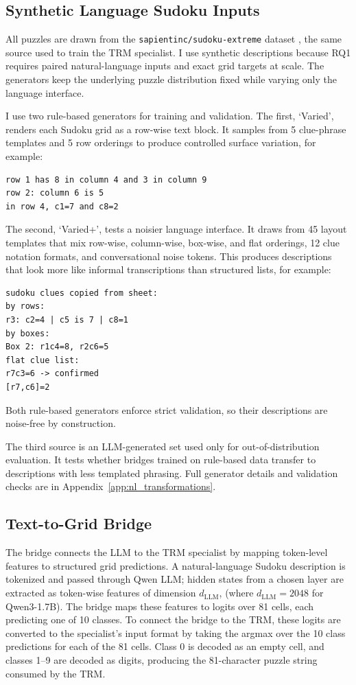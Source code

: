 \documentclass[11pt]{article}
\begin{document}
\subsection{Synthetic Language Sudoku Inputs}
\label{sec:synthetic_language_sudoku_inputs}

All puzzles are drawn from the \texttt{sapientinc/sudoku-extreme} dataset \cite{SapientincSudokuextremeDatasets}, the same source used to train the TRM specialist.
I use synthetic descriptions because RQ1 requires paired natural-language inputs and exact grid targets at scale.
The generators keep the underlying puzzle distribution fixed while varying only the language interface.

I use two rule-based generators for training and validation.
The first, `Varied', renders each Sudoku grid as a row-wise text block.
It samples from 5 clue-phrase templates and 5 row orderings to produce controlled surface variation, for example:
\begin{verbatim}
row 1 has 8 in column 4 and 3 in column 9
row 2: column 6 is 5
in row 4, c1=7 and c8=2
\end{verbatim}
The second, `Varied+', tests a noisier language interface.
It draws from 45 layout templates that mix row-wise, column-wise, box-wise, and flat orderings, 12 clue notation formats, and conversational noise tokens.
This produces descriptions that look more like informal transcriptions than structured lists, for example:
\begin{verbatim}
sudoku clues copied from sheet:
by rows:
r3: c2=4 | c5 is 7 | c8=1
by boxes:
Box 2: r1c4=8, r2c6=5
flat clue list:
r7c3=6 -> confirmed
[r7,c6]=2
\end{verbatim}
Both rule-based generators enforce strict validation, so their descriptions are noise-free by construction.

The third source is an LLM-generated set used only for out-of-distribution evaluation.
It tests whether bridges trained on rule-based data transfer to descriptions with less templated phrasing.
Full generator details and validation checks are in Appendix~\ref{app:nl_transformations}.



\subsection{Text-to-Grid Bridge}
\label{sec:text_to_grid_bridge}

The bridge connects the LLM to the TRM specialist by mapping token-level features to structured grid predictions.
A natural-language Sudoku description is tokenized and passed through Qwen \cite{yangQwen3TechnicalReport2025} LLM; hidden states from a chosen layer are extracted as token-wise features of dimension $d_\text{LLM}$, (where $d_\text{LLM} = 2048$ for Qwen3-1.7B).
The bridge maps these features to logits over 81 cells, each predicting one of 10 classes.
To connect the bridge to the TRM, these logits are converted to the specialist's input format by taking the argmax over the 10 class predictions for each of the 81 cells.
Class 0 is decoded as an empty cell, and classes 1--9 are decoded as digits, producing the 81-character puzzle string consumed by the TRM.
\end{document}
